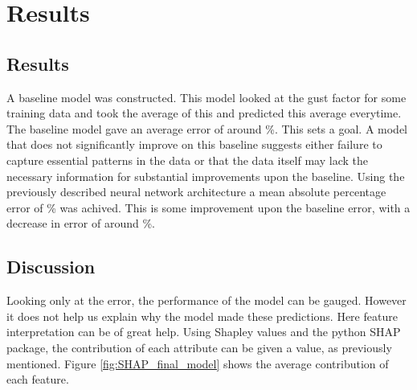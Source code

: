 
\chapter{Results} %

\label{Chapter5} %


\section{Results}
A baseline model was constructed. This model looked at the gust factor for some training data and took the average of this and predicted this average everytime. The baseline model gave an average error of around \baselineerror\%. This sets a goal. A model that does not significantly improve on this baseline suggests either failure to capture essential patterns in the data or that the data itself may lack the necessary information for substantial improvements upon the baseline. Using the previously described neural network architecture a mean absolute percentage error of \modelerror\% was achived. This is some improvement upon the baseline error, with a decrease in error of around \errorImprovement\%.

\section{Discussion}
Looking only at the error, the performance of the model can be gauged. However it does not help us explain why the model made these predictions. Here feature interpretation can be of great help. Using Shapley values and the python SHAP package, the contribution of each attribute can be given a value, as previously mentioned. Figure \ref{fig:SHAP_final_model} shows the average contribution of each feature.